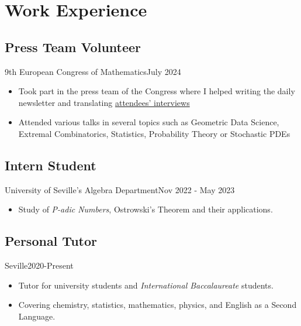 \section{Work Experience}
\subsection{Press Team Volunteer}{9th European Congress of Mathematics}{July 2024}
\begin{itemize}
    \item Took part in the press team of the Congress where I helped writing the daily newsletter and translating {\href{https://www.pressreader.com/spain/el-mundo-primera-edicion-weekend/20240721/282196541194051}{attendees' interviews}}
    \item Attended various talks in several topics such as Geometric Data Science, Extremal Combinatorics, Statistics, Probability Theory or Stochastic PDEs
\end{itemize}
\subsection{Intern Student}{University of Seville's Algebra Department}{Nov 2022 - May 2023}
\begin{itemize}
    \item Study of \textit{P-adic Numbers}, Ostrowski's Theorem and their applications. 
\end{itemize}
\subsection{Personal Tutor}{Seville}{2020-Present}
\begin{itemize}
    \item Tutor for university students and \textit{International Baccalaureate} students.
    \item Covering chemistry, statistics, mathematics, physics, and English as a Second Language.
\end{itemize}




